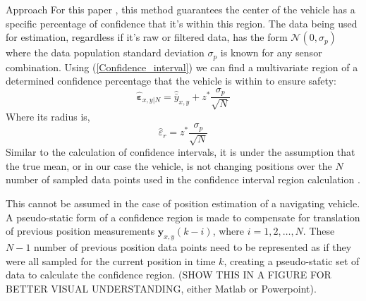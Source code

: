 \begin{section}{Approach}
For this paper , this method guarantees the center of the vehicle has a specific percentage of confidence that it's within this region. The data being used for estimation, regardless if it's raw or filtered data, has the form $\mathcal{N}(0,\sigma_p)$ where the data population standard deviation $\sigma_p$ is known for any sensor combination. Using (\ref{Confidence_interval})  we can find a multivariate region of a determined confidence percentage that the vehicle is within to ensure safety:
    \begin{equation}
    \label{Confidence_region}
		\hat{\bm{\varepsilon}}_{x,y|N} = \hat{\bar{y}}_{x,y} + z^{*}\frac{\sigma_p}{\sqrt{N}}
	\end{equation}
Where its radius is,
    \begin{equation}
		\hat{\varepsilon}_r = z^{*}\frac{\sigma_p}{\sqrt{N}}
	\end{equation}
Similar to the calculation of confidence intervals, it is under the assumption that the true mean, or in our case the vehicle, is not changing positions over the $N$ number of sampled data points used in the confidence interval region calculation .

 This cannot be assumed in the case of position estimation of a navigating vehicle. A pseudo-static form of a confidence region is made to compensate for translation of previous position measurements $\bm{y}_{x,y}(k-i)$, where $i=1,2,\dots,N$. These $N-1$ number of previous position data points need to be represented as if they were all sampled for the current position in time $k$, creating a pseudo-static set of data to calculate the confidence region. (SHOW THIS IN A FIGURE FOR BETTER VISUAL UNDERSTANDING, either Matlab or Powerpoint).


\end{section}
